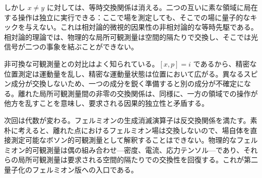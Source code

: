 \begin{classroomqa}
\end{classroomqa}

しかし \(x\neq y\) に対しては、等時交換関係は消える。二つの互いに素な領域に局在する操作は独立に実行できる：ここで場を測定しても、そこでの場に量子的なキックを与えない。これは相対論的微視的因果性の非相対論的な等時先駆である。相対論的理論では、物理的な局所可観測量は空間的隔たりで交換し、そこでは光信号が二つの事象を結ぶことができない。

非可換な可観測量との対比はよく知られている。\([x,p]=i\) であるから、精密な位置測定は運動量を乱し、精密な運動量状態は位置において広がる。異なるスピン成分が交換しないため、一つの成分を鋭く準備すると別の成分が不確定になる。離れた局所可観測量間の非零の交換関係は、同様に、一方の領域での操作が他方を乱すことを意味し、要求される因果的独立性と矛盾する。

\begin{classroomqa}
\end{classroomqa}

次回は代数が変わる。フェルミオンの生成消滅演算子は反交換関係を満たす。素朴に考えると、離れた点におけるフェルミオン場は交換しないので、場自体を直接測定可能なボソン的可観測量として解釈することはできない。物理的なフェルミオン的可観測量は偶の組み合わせ---密度、電流、応力テンソル---であり、それらの局所可観測量は要求される空間的隔たりでの交換性を回復する。これが第二量子化のフェルミオン版への入口である。
